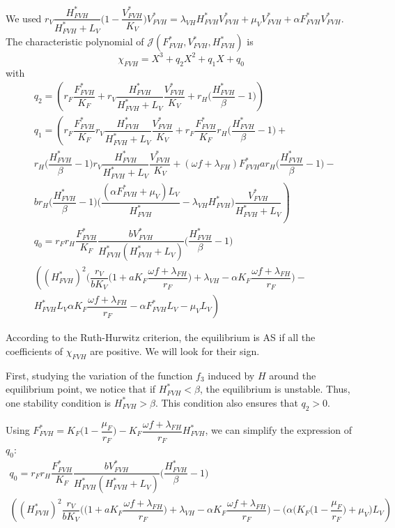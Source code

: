\documentclass{article}
\newcommand{\lf}{\lambda_{FH}}
\newcommand{\lv}{\lambda_{VH}}
\newcommand{\FHterme}{\omega f + \lf}
\begin{document}
\begin{itemize}
We used $r_V \dfrac{H^*_{FVH}}{H^*_{FVH} + L_V} \Big(1 - \dfrac{V^*_{FVH}}{K_V} \Big)V^*_{FVH} = \lv H^*_{FVH} V^*_{FVH} + \mu_VV^*_{FVH} + \alpha F^*_{FVH}V^*_{FVH} $.
The characteristic polynomial of $\mathcal{J}(F^*_{FVH}, V^*_{FVH}, H^*_{FVH})$ is 
\begin{equation}
\chi_{FVH} = X^3 + q_2X^2 + q_1 X + q_0
\end{equation}
with 
\begin{subequations}
\begin{align}
&q_2 = \left(r_F \dfrac{F^*_{FVH}}{K_F} + r_V \dfrac{H^*_{FVH}}{H^*_{FVH} + L_V}\dfrac{V^*_{FVH}}{K_V} + r_H\Big(\dfrac{H^*_{FVH}}{\beta} - 1\Big) \right)\\
&q_1 = \left(r_F \dfrac{F^*_{FVH}}{K_F}r_V \dfrac{H^*_{FVH}}{H^*_{FVH} + L_V}\dfrac{V^*_{FVH}}{K_V} +r_F \dfrac{F^*_{FVH}}{K_F} r_H\Big(\dfrac{H^*_{FVH}}{\beta} - 1\Big) + \right. \\ \nonumber &\left. r_H\Big(\dfrac{H^*_{FVH}}{\beta} - 1\Big)r_V \dfrac{H^*_{FVH}}{H^*_{FVH} + L_V}\dfrac{V^*_{FVH}}{K_V} + (\FHterme) F^*_{FVH}a r_H \Big(\dfrac{H^*_{FVH}}{\beta} - 1\Big) - \right. \\ \nonumber &\left. b r_H \Big(\dfrac{H^*_{FVH}}{\beta} - 1\Big)\Big(\dfrac{(\alpha F^*_{FVH} + \mu_V)L_V}{H^*_{FVH}} - \lv H^*_{FVH} \Big)\dfrac{V^*_{FVH}}{H^*_{FVH}+L_V} \right) \\
&q_0 = r_F r_H \dfrac{F^*_{FVH}}{K_F} \dfrac{bV^*_{FVH}}{H^*_{FVH}(H^*_{FVH}+L_V)}\Big(\dfrac{H^*_{FVH}}{\beta}-1\Big) \\ \nonumber
&\left( (H^*_{FVH})^2 \Big(\dfrac{r_V}{bK_V}\Big( 1 + aK_F \dfrac{\FHterme}{r_F} \Big)+ \lv - \alpha K_F \dfrac{\FHterme}{r_F} \Big) - 
\right. \\ \nonumber & \left.
H^*_{FVH} L_V \alpha K_F \dfrac{\FHterme}{r_F} - \alpha F^*_{FVH} L_V - \mu_V L_V \right)
\end{align}
\end{subequations}

According to the Ruth-Hurwitz criterion, the equilibrium is AS if all the coefficients of $\chi_{FVH}$ are positive. We will look for their sign.

First, studying the variation of the function $f_3$ induced by $H$ around the equilibrium point, we notice that if $H^*_{FVH} < \beta$, the equilibrium is unstable. Thus, one stability condition is $H^*_{FVH} > \beta$. This condition also ensures that $q_2 > 0$.


Using $F^*_{FVH} = K_F\Big(1 - \dfrac{\mu_F}{r_F} \Big) - K_F\dfrac{\FHterme}{r_F} H^*_{FVH}$, we can simplify the expression of $q_0$:
\begin{multline}
q_0 = r_F r_H \dfrac{F^*_{FVH}}{K_F} \dfrac{bV^*_{FVH}}{H^*_{FVH}(H^*_{FVH}+L_V)}\Big(\dfrac{H^*_{FVH}}{\beta}-1\Big) \\
\left( (H^*_{FVH})^2 \dfrac{r_V}{bK_V}\Big(\Big( 1 + aK_F \dfrac{\FHterme}{r_F}\Big) + \lv - \alpha K_F \dfrac{\FHterme}{r_F} \Big)
 - \Big(\alpha (K_F\big(1 - \dfrac{\mu_F}{r_F} \big) + \mu_V\Big) L_V \right)
\end{multline}


\end{itemize}
\end{document}

